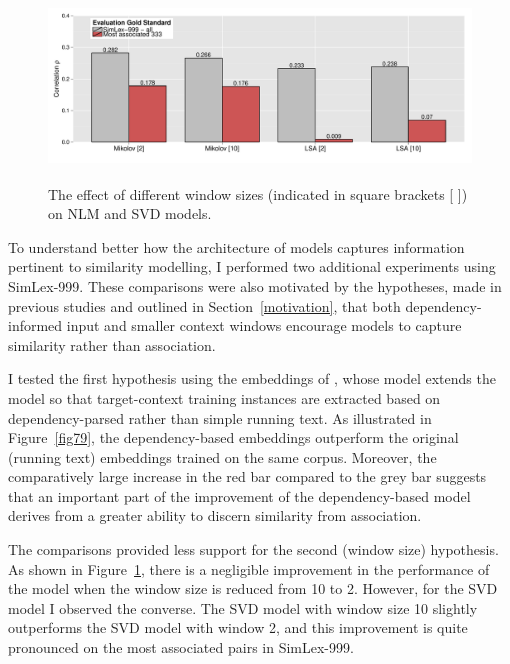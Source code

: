 \begin{figure}[]  \includegraphics[width = \textwidth,height=5cm]{Chapter_2/Figure_3B_CL}  \caption{\label{fig10} The effect of different window sizes (indicated in square brackets [ ]) on NLM and SVD models. }\end{figure}

To understand better how the architecture of models captures information pertinent to similarity modelling, I performed two additional experiments using SimLex-999. These comparisons were also motivated by the hypotheses, made in previous studies and outlined in Section~\ref{motivation}, that both dependency-informed input and smaller context windows encourage models to capture similarity rather than association. 

I tested the first hypothesis using the embeddings of \cite{levy2014dependency}, whose model extends the \cite{mikolov2013efficient} model so that target-context training instances are extracted based on dependency-parsed rather than simple running text. As illustrated in Figure~\ref{fig79}, the dependency-based embeddings outperform the original (running text) embeddings trained on the same corpus. Moreover, the comparatively large increase in the red bar compared to the grey bar suggests that an important part of the improvement of the dependency-based model derives from a greater ability to discern similarity from association. 

The comparisons provided less support for the second (window size) hypothesis. As shown in Figure~\ref{fig10}, there is a negligible improvement in the performance of the \cite{} model when the window size is reduced from 10 to 2. However, for the SVD model I observed the converse. The SVD model with window size 10 slightly outperforms the SVD model with window 2, and this improvement is quite pronounced on the most associated pairs in SimLex-999. 

